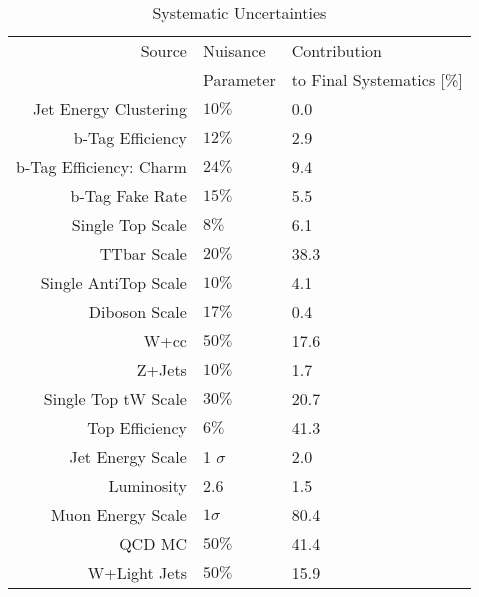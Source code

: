 \begin{table}[htb]
\begin{center}
\small
\begin{tabular}{|r|l|l|}
\hline
Source    &Nuisance   &Contribution\\
          &Parameter  &to Final Systematics [\%]\\
\hline
Jet Energy Clustering   & $10\%$      &0.0  \\
b-Tag Efficiency        & $12\%$      &2.9  \\
b-Tag Efficiency: Charm & $24\%$      &9.4  \\
b-Tag Fake Rate         & $15\%$      &5.5  \\
Single Top Scale        & $8\%$       &6.1  \\
TTbar Scale             & $20\%$      &38.3 \\
Single AntiTop Scale    & $10\%$      &4.1  \\
Diboson Scale           & $17\%$      &0.4  \\
W+cc                    & $50\%$      &17.6 \\ 
Z+Jets                  & $10\%$      &1.7  \\
Single Top tW Scale     & $30\%$      &20.7 \\
Top Efficiency          & $6\% $      &41.3 \\
Jet Energy Scale        & 1 $\sigma$  &2.0  \\
Luminosity              & 2.6         &1.5  \\
Muon Energy Scale       & $1\sigma$   &80.4 \\
QCD MC                  & $50\%$      &41.4 \\
W+Light Jets            & $50\%$      &15.9 \\
\hline
\end{tabular}
\caption{Systematic Uncertainties}%
\label{tab:NuisanceTable}
\end{center}
\end{table}





